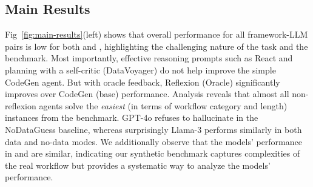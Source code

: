 \subsection{Main Results}
Fig~\ref{fig:main-results}(left) shows that overall performance for all framework-LLM pairs is low for both \real{} and \synth{}, highlighting the challenging nature of the task and the benchmark. Most importantly, effective reasoning prompts such as React and planning with a self-critic (DataVoyager) do not help improve the simple CodeGen agent. But with oracle feedback, Reflexion (Oracle) significantly improves over CodeGen (base) performance.  
Analysis reveals that almost all non-reflexion agents solve the \emph{easiest} (in terms of workflow category and length) instances from the benchmark. GPT-4o refuses to hallucinate in the NoDataGuess baseline, whereas surprisingly Llama-3 performs similarly in both data and no-data modes. 
We additionally observe that the models' performance in \real{} and \synth{} are similar, indicating our synthetic benchmark captures complexities of the real workflow but provides a systematic way to analyze the models' performance.  




